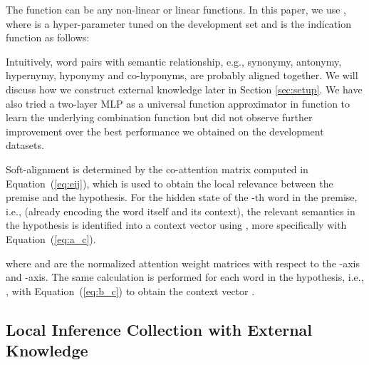 \documentclass[11pt,a4paper]{article}
\begin{document}
The function  can be any non-linear or linear functions. In this paper, we use , where  is a hyper-parameter tuned on the development set and  is the indication function as follows:

Intuitively, word pairs with semantic relationship, e.g., synonymy, antonymy, hypernymy, hyponymy and co-hyponyms, are probably aligned together. We will discuss how we construct external knowledge later in Section \ref{sec:setup}. We have also tried a two-layer MLP as a universal function approximator in function  to learn the underlying combination function but did not observe further improvement over the best performance we obtained on the development datasets. 

Soft-alignment is determined by the co-attention matrix  computed in Equation~(\ref{eq:eij}), which is used to obtain the local relevance between the premise and the hypothesis. For the hidden state of the -th word in the premise, i.e.,  (already encoding the word itself and its context), the relevant semantics in the hypothesis is identified into a context vector  using , more specifically with Equation~(\ref{eq:a_c}).

\noindent where  and  are the normalized attention weight matrices with respect to the -axis and -axis. The same calculation is performed for each word in the hypothesis, i.e., , with Equation~(\ref{eq:b_c}) to obtain the context vector . 

\subsection{Local Inference Collection with External Knowledge}
\end{document}

